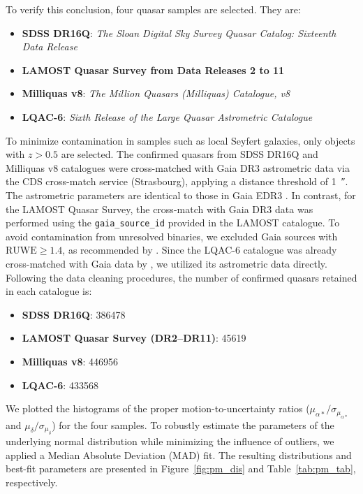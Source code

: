 To verify this conclusion, four quasar samples are selected. They are:
\begin{itemize}
    \item \textbf{SDSS DR16Q}: \textit{The Sloan Digital Sky Survey Quasar Catalog: Sixteenth Data Release} \citep{lykeSloanDigitalSky2020}
    \item \textbf{LAMOST Quasar Survey from Data Releases 2 to 11} \citep{dongLargeSkyArea2018, yaoLargeSkyArea2019, jinLargeSkyArea2023, lyuLargeSkyArea2025} 
    \item \textbf{Milliquas v8}: \textit{The Million Quasars (Milliquas) Catalogue, v8} \citep{fleschMillionQuasarsMilliquas2023}
    \item \textbf{LQAC-6}: \textit{Sixth Release of the Large Quasar Astrometric Catalogue} \citep{souchayLQAC6SixthRelease2024}
\end{itemize}
To minimize contamination in samples such as local Seyfert galaxies, only objects with $z>0.5$ are selected. The confirmed quasars from SDSS DR16Q and Milliquas v8 catalogues were cross-matched with Gaia DR3 astrometric data \citep{gaiacollaborationGaiaDataRelease2023} via the CDS cross-match service (Strasbourg), applying a distance threshold of \qty{1}{\arcsecond}. The astrometric parameters are identical to those in Gaia EDR3 \citep{vanleeuwenGaiaDR3Documentation2022}. In contrast, for the LAMOST Quasar Survey, the cross-match with Gaia DR3 data was performed using the \texttt{gaia\_source\_id} provided in the LAMOST catalogue. To avoid contamination from unresolved binaries, we excluded Gaia sources with $\mathrm{RUWE} \geq 1.4$, as recommended by \citet{fabriciusGaiaEarlyData2021}. Since the LQAC-6 catalogue was already cross-matched with Gaia data by \citet{souchayLQAC6SixthRelease2024}, we utilized its astrometric data directly. Following the data cleaning procedures, the number of confirmed quasars retained in each catalogue is:
\begin{itemize}
    \item \textbf{SDSS DR16Q}: \num{386478}
    \item \textbf{LAMOST Quasar Survey (DR2--DR11)}: \num{45619}
    \item \textbf{Milliquas v8}: \num{446956}
    \item \textbf{LQAC-6}: \num{433568}
\end{itemize}

We plotted the histograms of the proper motion-to-uncertainty ratios ($\mu_{\alpha*}/\sigma_{\mu_{\alpha*}}$ and $\mu_{\delta}/\sigma_{\mu_{\delta}}$) for the four samples. To robustly estimate the parameters of the underlying normal distribution while minimizing the influence of outliers, we applied a Median Absolute Deviation (MAD) fit. The resulting distributions and best-fit parameters are presented in Figure~\ref{fig:pm_dis} and Table~\ref{tab:pm_tab}, respectively.

